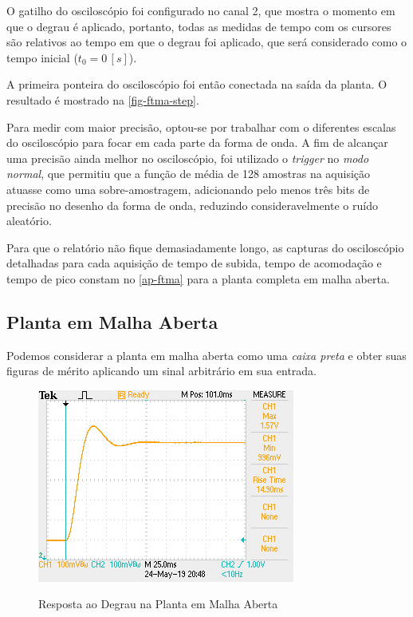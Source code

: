 \documentclass[
	12pt,				%
	article,			%
	openright,			%
	oneside,
	a4paper,			%
	chapter=TITLE,		%
	section=TITLE,		%
	english,			%
	french,				%
	spanish,			%
	brazil,				%
]{abntex2}
\begin{document}
        	O gatilho do osciloscópio foi configurado no canal 2, que mostra o momento em que o degrau é aplicado, portanto, todas as medidas de tempo com os cursores são relativos ao tempo em que o degrau foi aplicado, que será considerado como o tempo inicial ($t_0=0\,[s]$).
        	
        	A primeira ponteira do osciloscópio foi então conectada na saída da planta. O resultado é mostrado na \autoref{fig-ftma-step}.
        	
        	Para medir com maior precisão, optou-se por trabalhar com o diferentes escalas do osciloscópio para focar em cada parte da forma de onda. A fim de alcançar uma precisão ainda melhor no osciloscópio, foi utilizado o \textit{trigger} no \textit{modo normal}, que permitiu que a função de média de 128 amostras na aquisição atuasse como uma sobre-amostragem, adicionando pelo menos três bits de precisão no desenho da forma de onda, reduzindo consideravelmente o ruído aleatório.
        	
        	Para que o relatório não fique demasiadamente longo, as capturas do osciloscópio detalhadas para cada aquisição de tempo de subida, tempo de acomodação e tempo de pico constam no \autoref{ap-ftma} para a planta completa em malha aberta.
    	
    	\subsection{Planta em Malha Aberta}
        
            Podemos considerar a planta em malha aberta como uma \textit{caixa preta} e obter suas figuras de mérito aplicando um sinal arbitrário em sua entrada.
            
            \begin{figure}[htbp]
            	\centering
            	\caption{Resposta ao Degrau na Planta em Malha Aberta}
            	\includegraphics[width=\textwidth,height=240px,keepaspectratio]{imgs/ftma/step_response.JPG}
            	\label{fig-ftma-step}
        	\end{figure}
            
\end{document}
